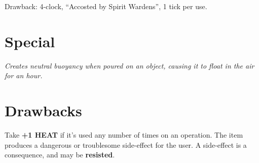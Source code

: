 \documentclass{article}
\begin{document}
\begin{multicols*}{3}
Drawback: 4-clock, ``Accosted by Spirit Wardens'', 1 tick per use.

\section*{Special}
\textit{Creates neutral buoyancy when poured on an object, causing it to float in the air for an hour.}


\section*{Drawbacks}
\begin{itemize}
    Take \textbf{+1 \uppercase{heat}} if it's used any number of times on an operation.
    The item produces a dangerous or troublesome side-effect for the user.
    A side-effect is a consequence, and may be \textbf{resisted}.
\end{itemize}

\end{multicols*}
\end{document}
